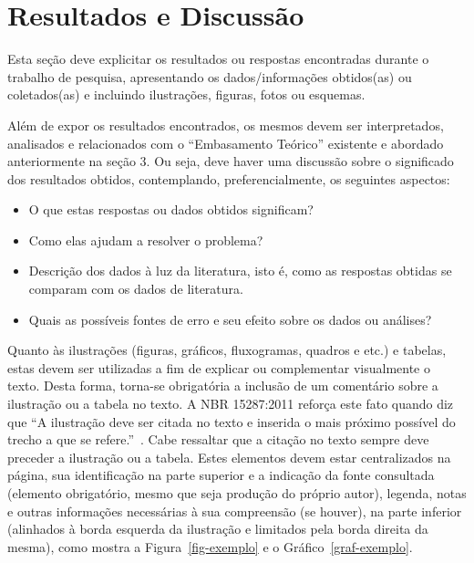 \documentclass[10pt, a4paper]{article}
\begin{document}
\section{Resultados e Discussão}
\label{sec-resultados}

Esta seção deve explicitar os resultados ou respostas encontradas durante o trabalho de pesquisa, apresentando os dados/informações obtidos(as) ou coletados(as) e incluindo ilustrações, figuras, fotos ou esquemas.

Além de expor os resultados encontrados, os mesmos devem ser interpretados, analisados e relacionados com o ``Embasamento Teórico'' existente e abordado anteriormente na seção 3. Ou seja, deve haver uma discussão sobre o significado dos resultados obtidos, contemplando, preferencialmente, os seguintes aspectos: 

\begin{itemize}
	\item O que estas respostas ou dados obtidos significam? 
	\item Como elas ajudam a resolver o problema? 
	\item Descrição dos dados à luz da literatura, isto é, como as respostas obtidas se comparam com os dados de literatura.
	\item Quais as possíveis fontes de erro e seu efeito sobre os dados ou análises?
\end{itemize}

Quanto às ilustrações (figuras, gráficos, fluxogramas, quadros e etc.) e tabelas, estas devem ser utilizadas a fim de explicar ou complementar visualmente o texto. Desta forma, torna-se obrigatória a inclusão de um comentário sobre a ilustração ou a tabela no texto. A NBR 15287:2011 reforça este fato quando diz que ``A ilustração deve ser citada no texto e inserida o mais próximo possível do trecho a que se refere.''~\citep[p. 8]{abnt:nbr15287}. Cabe ressaltar que a citação no texto sempre deve preceder a ilustração ou a tabela. Estes elementos devem estar centralizados na página, sua identificação na parte superior e a indicação da fonte consultada (elemento obrigatório, mesmo que seja produção do próprio autor), legenda, notas e outras informações necessárias à sua compreensão (se houver), na parte inferior (alinhados à borda esquerda da ilustração e limitados pela borda direita da mesma), como mostra a Figura~\ref{fig-exemplo} e o Gráfico~\ref{graf-exemplo}.
\end{document}
